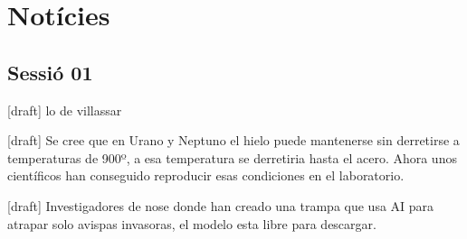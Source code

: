 \section{Notícies}

\subsection{Sessió 01}

[draft] lo de villassar

[draft] Se cree que en Urano y Neptuno el hielo puede mantenerse sin derretirse a temperaturas de 900º, a esa temperatura se derretiria hasta el acero. Ahora unos científicos han conseguido reproducir esas condiciones en el laboratorio.

[draft] Investigadores de nose donde han creado una trampa que usa AI para atrapar solo avispas invasoras, el modelo esta libre para descargar.
